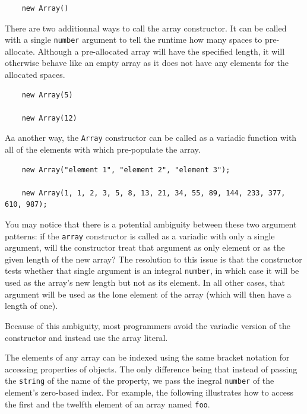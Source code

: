 \documentclass[11pt,letter]{book}
\begin{document}
    \begin{verbatim}
    new Array()
    \end{verbatim}
    
    There are two additionnal ways to call the array constructor. It can be called with a single 
    \texttt{number} argument to tell the runtime how many spaces to pre-allocate. Although a 
    pre-allocated array will have the specified length, it will otherwise behave like an empty array
    as it does not have any elements for the allocated spaces.
    
    \begin{verbatim}
    new Array(5)
    
    new Array(12)
    \end{verbatim}
    
    Aa another way, the \texttt{Array} constructor can be called as a variadic function with all of 
    the elements with which pre-populate the array.
    
    \begin{verbatim}
    new Array("element 1", "element 2", "element 3");
    
    new Array(1, 1, 2, 3, 5, 8, 13, 21, 34, 55, 89, 144, 233, 377, 610, 987);
    \end{verbatim}
    
    You may notice that there is a potential ambiguity between these two argument patterns: if the
    \texttt{array} constructor is called as a variadic with only a single argument, will the
    constructor treat that argument as only element or as the given length of the new array? The 
    resolution to this issue is that the constructor tests whether that single argument is an 
    integral \texttt{number}, in which case it will be used as the array's new length but not as its 
    element. In all other cases, that argument will be used as the lone element of the array (which 
    will then have a length of one). 
    
    Because of this ambiguity, most programmers avoid the variadic version of the constructor and 
    instead use the array literal.
    
    The elements of any array can be indexed using the same bracket notation for accessing 
    properties of objects. The only difference being that instead of passing the \texttt{string} of 
    the name of the property, we pass the inegral \texttt{number} of the element's zero-based index.
    For example, the following illustrates how to access the first and the twelfth element of an 
    array named \texttt{foo}.
    
\end{document}
